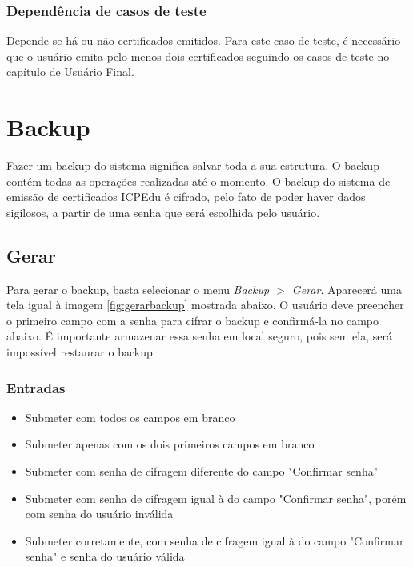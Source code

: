 \subsubsection{Dependência de casos de teste}
Depende se há ou não certificados emitidos. Para este caso de teste, é necessário que o usuário emita pelo menos dois certificados seguindo os casos de teste no capítulo de Usuário Final.

\section{Backup}

Fazer um backup do sistema significa salvar toda a sua estrutura. O backup contém todas as operações realizadas até o momento. O backup do sistema de emissão de certificados ICPEdu é cifrado, pelo fato de poder haver dados sigilosos, a partir de uma senha que será escolhida pelo usuário.

\subsection{Gerar}

Para gerar o backup, basta selecionar o menu \textit{Backup $>$ Gerar}. Aparecerá uma tela igual à imagem \ref{fig:gerarbackup} mostrada abaixo. O usuário deve preencher o primeiro campo com a senha para cifrar o backup e confirmá-la no campo abaixo. É importante armazenar essa senha em local seguro, pois sem ela, será impossível restaurar o backup.

\subsubsection{Entradas}
\begin{itemize}

	\item Submeter com todos os campos em branco
	\item Submeter apenas com os dois primeiros campos em branco
	\item Submeter com senha de cifragem diferente do campo "Confirmar senha"
	\item Submeter com senha de cifragem igual à do campo "Confirmar senha", porém com senha do usuário inválida
	\item Submeter corretamente, com senha de cifragem igual à do campo "Confirmar senha" e senha do usuário válida
	
\end{itemize}


